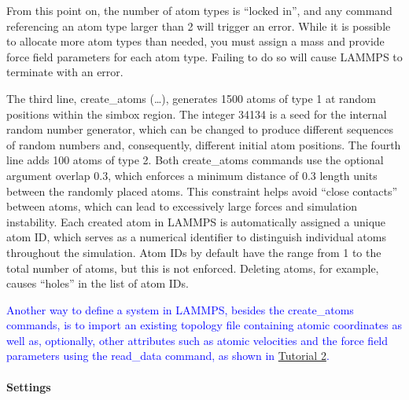 \documentclass[9pt,tutorial]{livecoms}
\newcommand{\lmpcmd}[1]{\colorbox{listing}{\textcolor{command}{\small{#1}}}} %
\begin{document}
\begin{note}
  From this point on, {\color{blue} the number of atom types is ``locked
    in'', and} any command referencing an atom type larger than 2 will
  trigger an error.  While it is possible to allocate more atom types
  than needed, you must assign a mass and provide force field parameters
  for each atom type.  Failing to do so will cause LAMMPS to terminate
  with an error.
\end{note}

The third line, \lmpcmd{create\_atoms (\dots)}, generates 1500 atoms of
type 1 at random positions within the \lmpcmd{simbox} region.
The integer 34134 is a seed for the internal random
number generator, which can be changed to produce different sequences of
random numbers and, consequently, different initial atom positions.  The
fourth line adds 100 atoms of type 2.  Both \lmpcmd{create\_atoms}
commands use the optional argument \lmpcmd{overlap 0.3}, which enforces
a minimum distance of 0.3 {\color{blue}length} units between the
randomly placed atoms.  This constraint helps avoid ``close contacts''
between atoms, which can lead to excessively large forces and simulation
instability. {\color{blue}Each created atom in LAMMPS is automatically assigned a
  unique atom ID, which serves as a numerical identifier to distinguish
  individual atoms throughout the simulation.  Atom IDs by default have
  the range from 1 to the total number of atoms, but this is not
  enforced.  Deleting atoms, for example, causes ``holes'' in the list
  of atom IDs.}

\begin{note}
  \textcolor{blue}{Another way to define a system in LAMMPS, besides the
    \lmpcmd{create\_atoms} commands, is to import an existing topology
    file containing atomic coordinates as well as, optionally, other
    attributes such as atomic velocities and the force field parameters
    using the \lmpcmd{read\_data} command, as shown in
    \hyperref[carbon-nanotube-label]{Tutorial 2}.}
\end{note}

\paragraph{Settings}
\end{document}
